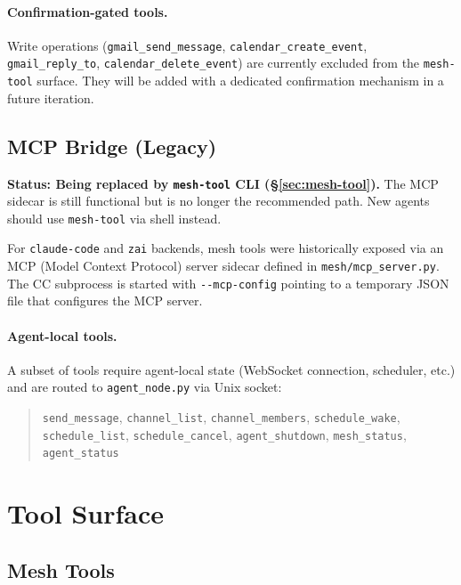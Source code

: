 \documentclass[11pt,a4paper]{article}
\newcommand{\code}[1]{\texttt{#1}}
\begin{document}
\paragraph{Confirmation-gated tools.}
Write operations (\code{gmail\_send\_message},
\code{calendar\_create\_event}, \code{gmail\_reply\_to},
\code{calendar\_delete\_event}) are currently excluded from the
\code{mesh-tool} surface. They will be added with a dedicated
confirmation mechanism in a future iteration.

\subsection{MCP Bridge (Legacy)}
\label{sec:mcp}

\textbf{Status: Being replaced by \code{mesh-tool} CLI
(\S\ref{sec:mesh-tool}).} The MCP sidecar is still functional but is no
longer the recommended path. New agents should use \code{mesh-tool} via
shell instead.

For \code{claude-code} and \code{zai} backends, mesh tools were
historically exposed via an MCP (Model Context Protocol) server sidecar
defined in \code{mesh/mcp\_server.py}. The CC subprocess is started with
\code{-{}-mcp-config} pointing to a temporary JSON file that configures
the MCP server.

\paragraph{Agent-local tools.}
A subset of tools require agent-local state (WebSocket connection,
scheduler, etc.) and are routed to \code{agent\_node.py} via Unix
socket:

\begin{quote}
\small
\code{send\_message}, \code{channel\_list}, \code{channel\_members},
\code{schedule\_wake}, \code{schedule\_list}, \code{schedule\_cancel},
\code{agent\_shutdown}, \code{mesh\_status}, \code{agent\_status}
\end{quote}

\section{Tool Surface}
\label{sec:tools}

\subsection{Mesh Tools}
\end{document}
